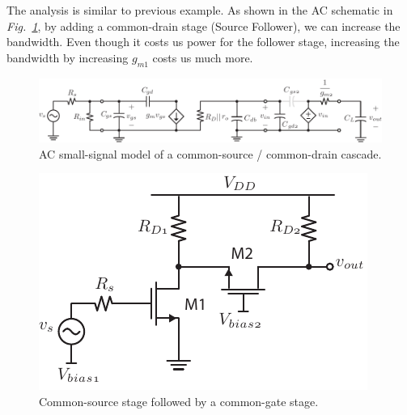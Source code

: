 The analysis is similar to previous example.  As shown in the AC schematic in \emph{Fig.~\ref{fig:9cs_cd_casc_ss}}, by adding a common-drain stage (Source Follower), we can increase the bandwidth. Even though it costs us power for the follower stage, increasing the bandwidth by increasing $g_{m1}$ costs us much more.
\vspace{1cm}
\begin{figure}[H]
\centering
\includegraphics[scale=0.95]{9cs_cd_casc_ss}
\caption{AC small-signal model of a common-source / common-drain cascade.}
\label{fig:9cs_cd_casc_ss}
\end{figure}
\newpage
\begin{figure}[t]
\centering
\includegraphics[scale=1.25]{10cs_cg_cascade}
\caption{Common-source stage followed by a common-gate stage.}
\label{fig:10cs_cg_cascade}
\end{figure}
